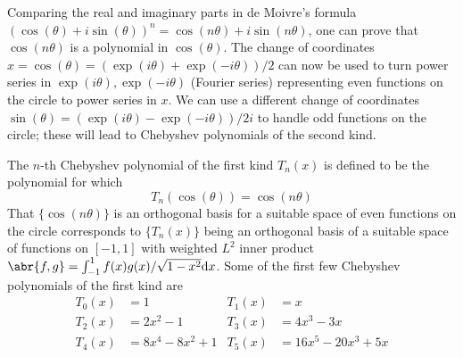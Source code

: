 \documentclass[11pt,leqno]{article}
\theoremstyle{plain}
\theoremstyle{definition}
\numberwithin{equation}{section}
\numberwithin{lem}{section}
\begin{document}
\begin{figure}[h]
	\centering
\end{figure}
Comparing the real and imaginary parts in de Moivre's formula $(\cos(\theta) + i\sin(\theta))^n = \cos(n\theta) + i\sin(n\theta)$, one can prove that $\cos(n\theta)$ is a polynomial in $\cos(\theta)$. The change of coordinates $x = \cos(\theta) = (\exp(i\theta)+\exp(-i\theta))/2$ can now be used to turn power series in $\exp(i\theta),\exp(-i\theta)$ (Fourier series) representing even functions on the circle to power series in $x$. We can use a different change of coordinates $\sin(\theta) = (\exp(i\theta)-\exp(-i\theta))/2i$ to handle odd functions on the circle; these will lead to Chebyshev polynomials of the second kind.

The $n$-th Chebyshev polynomial of the first kind $T_n(x)$ is defined to be the polynomial for which
\[T_n(\cos(\theta)) = \cos(n\theta)\]
That $\{\cos(n\theta)\}$ is an orthogonal basis for a suitable space of even functions on the circle corresponds to $\{T_n(x)\}$ being an orthogonal basis of a suitable space of functions on $[-1,1]$ with weighted $L^2$ inner product $\abr{f,g} = \int_{-1}^1f(x)g(x)/\sqrt{1-x^2}\dd x$.
Some of the first few Chebyshev polynomials of the first kind are 
\begin{align*}
	T_0(x) &= 1 & T_1(x) &= x\\
	T_2(x) &= 2x^2-1& T_3(x) &=4x^3-3x \\
	T_4(x) &= 8x^4-8x^2+1& T_5(x) &= 16x^5-20x^3+5x
\end{align*}
\end{document}
